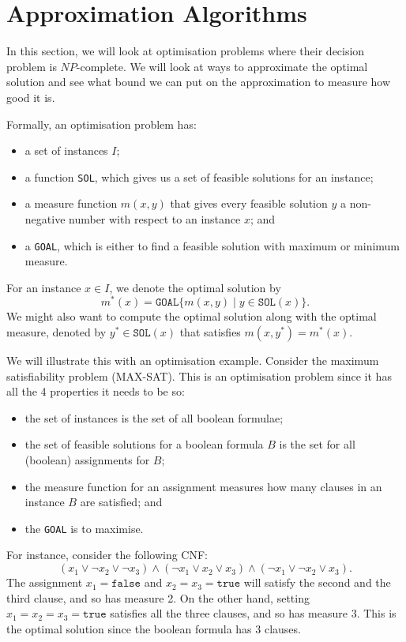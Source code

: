 \documentclass[a4paper, openany]{memoir}
\begin{document}
    \newpage

    \section{Approximation Algorithms}
    In this section, we will look at optimisation problems where their decision problem is $NP$-complete. We will look at ways to approximate the optimal solution and see what bound we can put on the approximation to measure how good it is.

    Formally, an optimisation problem has:
    \begin{itemize}
        \item a set of instances $I$;
        \item a function \texttt{SOL}, which gives us a set of feasible solutions for an instance;
        \item a measure function $m(x, y)$ that gives every feasible solution $y$ a non-negative number with respect to an instance $x$; and
        \item a \texttt{GOAL}, which is either to find a feasible solution with maximum or minimum measure.
    \end{itemize}
    For an instance $x \in I$, we denote the optimal solution by
    \[m^*(x) = \texttt{GOAL}\{ m(x, y) \mid y \in \texttt{SOL}(x) \}.\]
    We might also want to compute the optimal solution along with the optimal measure, denoted by $y^* \in \texttt{SOL}(x)$ that satisfies $m(x, y^*) = m^*(x)$.

    We will illustrate this with an optimisation example. Consider the maximum satisfiability problem (MAX-SAT). This is an optimisation problem since it has all the 4 properties it needs to be so:
    \begin{itemize}
        \item the set of instances is the set of all boolean formulae;
        \item the set of feasible solutions for a boolean formula $B$ is the set for all (boolean) assignments for $B$;
        \item the measure function for an assignment measures how many clauses in an instance $B$ are satisfied; and
        \item the \texttt{GOAL} is to maximise.
    \end{itemize}
    For instance, consider the following CNF:
    \[(x_1 \lor \lnot x_2 \lor \lnot x_3) \land (\lnot x_1 \lor x_2 \lor x_3) \land (\lnot x_1 \lor \lnot x_2 \lor x_3).\]
    The assignment $x_1 = \texttt{false}$ and $x_2 = x_3 = \texttt{true}$ will satisfy the second and the third clause, and so has measure 2. On the other hand, setting $x_1 = x_2 = x_3 = \texttt{true} $ satisfies all the three clauses, and so has measure 3. This is the optimal solution since the boolean formula has 3 clauses.
\end{document}
